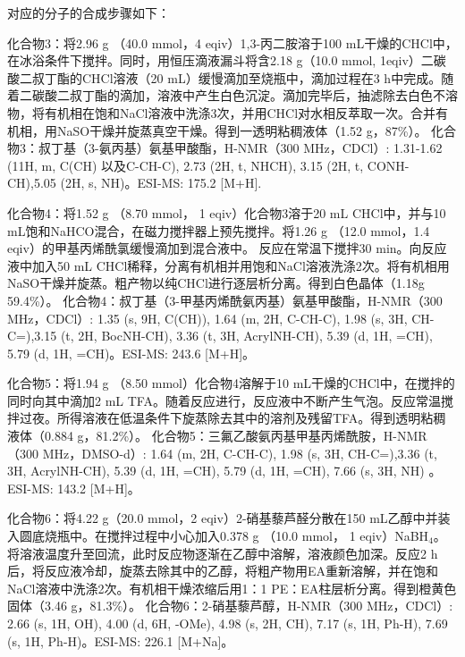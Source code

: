 对应的分子的合成步骤如下：

化合物3：将2.96 g （40.0 mmol，4 eqiv）1,3-丙二胺溶于100 mL干燥的CHCl中，在冰浴条件下搅拌。同时，用恒压滴液漏斗将含2.18 g（10.0 mmol, 1eqiv）二碳酸二叔丁酯的CHCl溶液（20 mL）缓慢滴加至烧瓶中，滴加过程在3 h中完成。随着二碳酸二叔丁酯的滴加，溶液中产生白色沉淀。滴加完毕后，抽滤除去白色不溶物，将有机相在饱和NaCl溶液中洗涤3次，并用CHCl对水相反萃取一次。合并有机相，用NaSO干燥并旋蒸真空干燥。得到一透明粘稠液体（1.52 g，87\%）。
化合物3：叔丁基（3-氨丙基）氨基甲酸酯，H-NMR（300 MHz，CDCl）: \text{$\delta$} 1.31-1.62 (11H, m, C(CH) 以及C-CH-C), 2.73 (2H, t, NHCH), 3.15 (2H, t, CONH-CH),5.05 (2H, s, NH)。ESI-MS: 175.2 [M+H]\text{$^+$}.

化合物4：将1.52 g （8.70 mmol， 1 eqiv）化合物3溶于20 mL CHCl中，并与10 mL饱和NaHCO混合，在磁力搅拌器上预先搅拌。将1.26 g （12.0 mmol，1.4 eqiv）的甲基丙烯酰氯缓慢滴加到混合液中。
反应在常温下搅拌30 min。向反应液中加入50 mL CHCl稀释，分离有机相并用饱和NaCl溶液洗涤2次。将有机相用NaSO干燥并旋蒸。粗产物以纯CHCl进行逐层析分离。得到白色晶体（1.18g 59.4\%）。
化合物4：叔丁基（3-甲基丙烯酰氨丙基）氨基甲酸酯，H-NMR（300 MHz，CDCl）: \text{$\delta$} 1.35 (s, 9H, C(CH)), 1.64 (m, 2H, C-CH-C), 1.98 (s, 3H, CH-C=),3.15 (t, 2H, BocNH-CH), 3.36 (t, 3H, AcrylNH-CH), 5.39 (d, 1H, =CH), 5.79 (d, 1H, =CH)。ESI-MS: 243.6 [M+H]\text{$^+$}。

化合物5：将1.94 g （8.50 mmol）化合物4溶解于10 mL干燥的CHCl中，在搅拌的同时向其中滴加2 mL TFA。随着反应进行，反应液中不断产生气泡。反应常温搅拌过夜。所得溶液在低温条件下旋蒸除去其中的溶剂及残留TFA。得到透明粘稠液体（0.884 g，81.2\%）。
化合物5：三氟乙酸氨丙基甲基丙烯酰胺，H-NMR（300 MHz，DMSO-d）: \text{$\delta$}
1.64 (m, 2H, C-CH-C), 1.98 (s, 3H, CH-C=),3.36 (t, 3H, AcrylNH-CH), 5.39 (d, 1H, =CH), 5.79 (d, 1H, =CH), 7.66 (s, 3H, NH\text{$^+$})
。ESI-MS: 143.2 [M+H]\text{$^+$}。

化合物6：将4.22 g（20.0 mmol，2 eqiv）2-硝基藜芦醛分散在150 mL乙醇中并装入圆底烧瓶中。在搅拌过程中小心加入0.378 g （10.0 mmol， 1 eqiv）NaBH{$_4$}。将溶液温度升至回流，此时反应物逐渐在乙醇中溶解，溶液颜色加深。反应2 h后，将反应液冷却，旋蒸去除其中的乙醇，将粗产物用EA重新溶解，并在饱和NaCl溶液中洗涤2次。有机相干燥浓缩后用1：1 PE：EA柱层析分离。得到橙黄色固体（3.46 g，81.3\%）。
化合物6：2-硝基藜芦醇，H-NMR（300 MHz，CDCl）: \text{$\delta$} 2.66 (s, 1H, OH), 4.00 (d, 6H, -OMe), 4.98 (s, 2H, CH), 7.17 (s, 1H, Ph-H), 7.69 (s, 1H, Ph-H)。ESI-MS: 226.1 [M+Na]\text{$^+$}。

